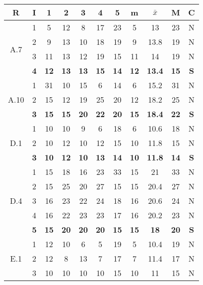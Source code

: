 \documentclass[11pt,a4paper,spanish,twoside]{report}
\begin{document}
\begin{table}[!h]
\centering
  \begin{tabular}{|c|c||c|c|c|c|c||c|c|c||c|}
    \hline
    \textbf{R} & \textbf{I} & \textbf{1} &
    \textbf{2} & \textbf{3} & \textbf{4} & \textbf{5} & \textbf{m}
    &\textbf{$\bar{x}$} &\textbf{M} & \textbf{C}\\
    \hline
    \multirow{4}{c}{A.7} & 1 & 5 & 12 & 8 & 17 & 23 & 5 & 13 & 23 & N \\
    & 2 & 9 & 13 & 10 & 18 & 19 & 9 & 13.8 & 19 & N \\
    & 3 & 11 & 13 & 12 & 19 & 15 & 11 & 14 & 19 & N \\
    & \textbf{4} & \textbf{12} & \textbf{13} & \textbf{13} & \textbf{15} &
    \textbf{14} & \textbf{12} & \textbf{13.4} & \textbf{15} & \textbf{S} \\ 
    \hline
    \multirow{3}{c}{A.10} & 1 & 31 & 10 & 15 & 6 & 14 & 6 & 15.2 & 31 & N \\
    & 2 & 15 & 12 & 19 & 25 & 20 & 12 & 18.2 & 25 & N \\
    & \textbf{3} & \textbf{15} & \textbf{15} & \textbf{20} & \textbf{22} &
    \textbf{20} & \textbf{15} & \textbf{18.4} & \textbf{22} & \textbf{S} \\ 
    \hline
    \multirow{3}{c}{D.1} & 1 & 10 & 10 & 9 & 6 & 18 & 6 & 10.6 & 18 & N \\
    & 2 & 10 & 12 & 10 & 12 & 15 & 10 & 11.8 & 15 & N \\
    & \textbf{3} & \textbf{10} & \textbf{12} & \textbf{10} & \textbf{13} &
    \textbf{14} & \textbf{10} & \textbf{11.8} & \textbf{14} & \textbf{S} \\ 
    \hline
    \multirow{5}{c}{D.4} & 1 & 15 & 18 & 16 & 23 & 33 & 15 & 21 & 33 & N \\
    & 2 & 15 & 25 & 20 & 27 & 15 & 15 & 20.4 & 27 & N \\
    & 3 & 16 & 23 & 22 & 24 & 18 & 16 & 20.6 & 24 & N \\
    & 4 & 16 & 22 & 23 & 23 & 17 & 16 & 20.2 & 23 & N \\
    & \textbf{5} & \textbf{15} & \textbf{20} & \textbf{20} & \textbf{20} &
    \textbf{15} & \textbf{15} & \textbf{18} & \textbf{20} & \textbf{S} \\
    \hline
    \multirow{5}{c}{E.1} & 1 & 12 & 10 & 6 & 5 & 19 & 5 & 10.4 & 19 & N \\
    & 2 & 12 & 8 & 13 & 7 & 17 & 7 & 11.4 & 17 & N \\
    & 3 & 10 & 10 & 10 & 10 & 15 & 10 & 11 & 15 & N \\

\end{tabular}
\end{table}
\end{document}
